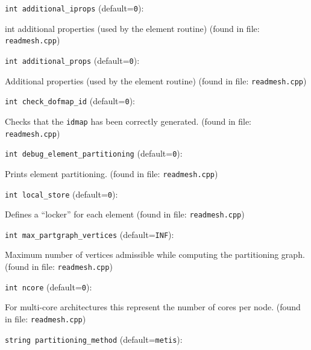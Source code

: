 \item\verb+int additional_iprops+ {\rm(default=\verb|0|)}:

int additional properties (used by the element routine)
 (found in file: \verb+readmesh.cpp+)
\item\verb+int additional_props+ {\rm(default=\verb|0|)}:

Additional properties (used by the element routine)
 (found in file: \verb+readmesh.cpp+)
\item\verb+int check_dofmap_id+ {\rm(default=\verb|0|)}:

Checks that the  \verb+idmap+  has been correctly generated. 
 (found in file: \verb+readmesh.cpp+)
\item\verb+int debug_element_partitioning+ {\rm(default=\verb|0|)}:

Prints element partitioning. 
 (found in file: \verb+readmesh.cpp+)
\item\verb+int local_store+ {\rm(default=\verb|0|)}:

Defines a ``locker'' for each element
 (found in file: \verb+readmesh.cpp+)
\item\verb+int max_partgraph_vertices+ {\rm(default=\verb|INF|)}:

Maximum number of vertices admissible while computing the
partitioning graph.
 (found in file: \verb+readmesh.cpp+)
\item\verb+int ncore+ {\rm(default=\verb|0|)}:

For multi-core architectures this represent the number
 of cores per node. 
 (found in file: \verb+readmesh.cpp+)
\item\verb+string partitioning_method+ {\rm(default=\verb|metis|)}:


